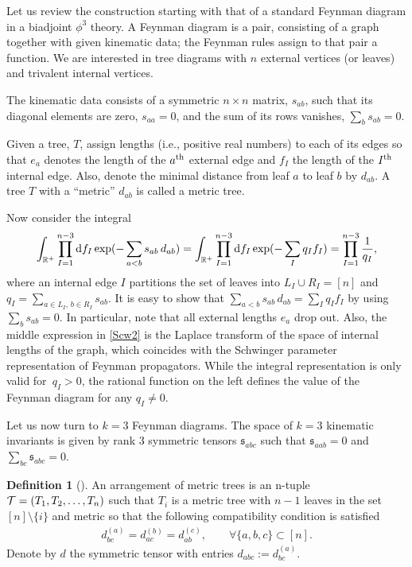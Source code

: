 \documentclass[pdftex]{sigma}
\def \s {\sigma}
\theoremstyle{definition}
\newtheorem{defn}[thm]{Definition}
\def \be {\begin{equation}}
\def \ee {\end{equation}}
\def \be {\begin{equation}}
\def \s {\mathfrak{s}}
\numberwithin{equation}{section}
\begin{document}
Let us review the construction starting with that of a standard Feynman diagram in a biadjoint $\phi^3$ theory. A Feynman diagram is a pair, consisting of a graph together with given kinematic data; the Feynman rules assign to that pair a function. We are interested in tree diagrams with $n$ external vertices (or leaves) and trivalent internal vertices.

The kinematic data consists of a symmetric $n\times n$ matrix, $s_{ab}$, such that its diagonal elements are zero, $s_{aa}=0$, and the sum of its rows vanishes, $\sum_b s_{ab}=0$.

Given a tree, $T$, assign lengths (i.e., positive real numbers) to each of its edges so that $e_a$ denotes the length of the $a^{\rm th}$ external edge and $f_I$ the length of the $I^{\rm th}$ internal edge. Also, denote the minimal distance from leaf $a$ to leaf $b$ by $d_{ab}$. A tree $T$ with a ``metric'' $d_{ab}$ is called a metric tree.

Now consider the integral
\be\label{Scw2}
\int_{\mathbb{R}^+} \prod_{I=1}^{n-3}{\rm d}f_I \exp(-\sum_{a<b}s_{ab}\, d_{ab})=\int_{\mathbb{R}^+} \prod_{I=1}^{n-3}{\rm d}f_I \exp(-\sum_{I}q_I f_I) =\prod_{I=1}^{n-3}\frac{1}{q_I} ,
\ee
where an internal edge $I$ partitions the set of leaves into $L_I\cup R_I = [n]$ and $q_I = \sum_{a\in L_I,\, b\in R_I} s_{ab}.$
It is easy to show that $\sum_{a<b}s_{ab}\, d_{ab} = \sum_{I}q_I f_I $ by using $\sum_b s_{ab}=0$. In particular, note that all external lengths $e_a$ drop out. Also, the middle expression in \eqref{Scw2} is the Laplace transform of the space of internal lengths of the graph, which coincides with the Schwinger parameter representation of Feynman propagators. While the integral representation is only valid for~${q_I>0}$, the rational function on the left defines the value of the Feynman diagram for any $q_I\neq 0$.

Let us now turn to $k=3$ Feynman diagrams. The space of $k=3$ kinematic invariants is given by rank 3 symmetric tensors $\s_{abc}$ such that $\s_{aab}=0$ and $\sum_{bc}\s_{abc}=0$.

\begin{defn}[\cite{herrmann2008draw}]\label{metricTreeArrangement}
An arrangement of metric trees is an n-tuple ${\cal T} = ( T_1,T_2,\dots ,T_n)$ such that $T_i$ is a metric tree with $n-1$ leaves in the set $[n]\setminus \{ i \}$ and metric  so that the following compatibility condition is satisfied
\begin{gather*}%
d^{(a)}_{bc} = d^{(b)}_{ac} =d^{(c)}_{ab}, \qquad \forall\{a,b,c\}\subset [n].
\end{gather*}
Denote by $d$ the symmetric tensor with entries $d_{abc}:=d^{(a)}_{bc}$.
\end{defn}
\end{document}
